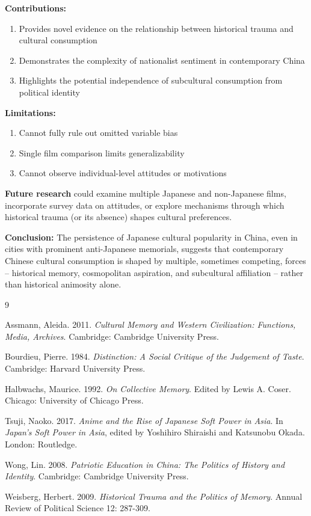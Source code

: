 \documentclass[12pt]{article}
\begin{document}
\textbf{Contributions:}
\begin{enumerate}
\item Provides novel evidence on the relationship between historical trauma and cultural consumption
\item Demonstrates the complexity of nationalist sentiment in contemporary China
\item Highlights the potential independence of subcultural consumption from political identity
\end{enumerate}

\textbf{Limitations:}
\begin{enumerate}
\item Cannot fully rule out omitted variable bias
\item Single film comparison limits generalizability
\item Cannot observe individual-level attitudes or motivations
\end{enumerate}

\textbf{Future research} could examine multiple Japanese and non-Japanese films, incorporate survey data on attitudes, or explore mechanisms through which historical trauma (or its absence) shapes cultural preferences.

\textbf{Conclusion:} The persistence of Japanese cultural popularity in China, even in cities with prominent anti-Japanese memorials, suggests that contemporary Chinese cultural consumption is shaped by multiple, sometimes competing, forces -- historical memory, cosmopolitan aspiration, and subcultural affiliation -- rather than historical animosity alone.


\begin{thebibliography}{9}

Assmann, Aleida. 2011. \textit{Cultural Memory and Western Civilization: Functions, Media, Archives}. Cambridge: Cambridge University Press.

Bourdieu, Pierre. 1984. \textit{Distinction: A Social Critique of the Judgement of Taste}. Cambridge: Harvard University Press.

Halbwachs, Maurice. 1992. \textit{On Collective Memory}. Edited by Lewis A. Coser. Chicago: University of Chicago Press.

Tsuji, Naoko. 2017. \textit{Anime and the Rise of Japanese Soft Power in Asia}. In \textit{Japan's Soft Power in Asia}, edited by Yoshihiro Shiraishi and Katsunobu Okada. London: Routledge.

Wong, Lin. 2008. \textit{Patriotic Education in China: The Politics of History and Identity}. Cambridge: Cambridge University Press.

Weisberg, Herbert. 2009. \textit{Historical Trauma and the Politics of Memory}. Annual Review of Political Science 12: 287-309.

\end{thebibliography}
\end{document}
